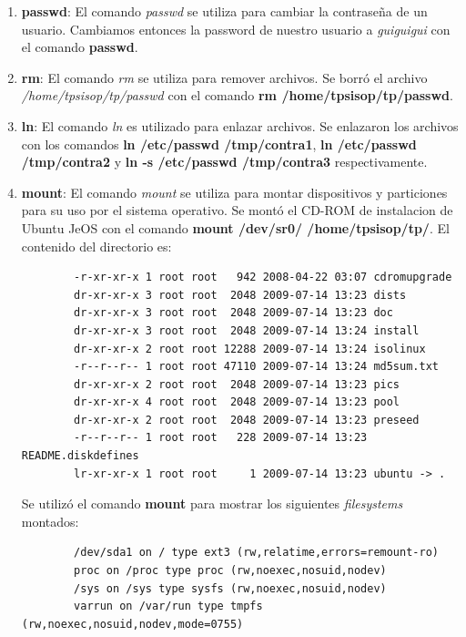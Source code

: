 \documentclass[a4paper,11pt] {article}
\begin{document}
\begin{enumerate}
		\begin{verbatim}
	 			127.0.0.1	localhost
			::1     ip6-localhost ip6-loopback
		\end{verbatim}
Luego para mostrar las l\'ineas de todos los archivos en \textit{/etc} que contienen el texto ``POSIX'' se utiliz\'o el comando \textbf{grep -r POSIX | grep -v} en la carpeta \textit{/etc}.
	\item \textbf{passwd}: El comando \textit{passwd} se utiliza para cambiar la contraseña de un usuario. Cambiamos entonces la password de nuestro usuario a \textit{guiguigui} con el comando \textbf{passwd}.
	\item \textbf{rm}: El comando \textit{rm} se utiliza para remover archivos. Se borr\'o el archivo \\ \textit{/home/tpsisop/tp/passwd} con el comando \textbf{rm /home/tpsisop/tp/passwd}.
	\item \textbf{ln}: El comando \textit{ln} es utilizado para enlazar archivos. Se enlazaron los archivos con los comandos \textbf{ln /etc/passwd /tmp/contra1}, \textbf{ln /etc/passwd /tmp/contra2} y \textbf{ln -s /etc/passwd /tmp/contra3} respectivamente.
	\item \textbf{mount}: El comando \textit{mount} se utiliza para montar dispositivos y particiones para su uso por el sistema operativo. Se mont\'o el CD-ROM de instalacion de Ubuntu JeOS con el comando \textbf{mount /dev/sr0/ /home/tpsisop/tp/}. El contenido del directorio es:
	\begin{verbatim}
		-r-xr-xr-x 1 root root   942 2008-04-22 03:07 cdromupgrade
		dr-xr-xr-x 3 root root  2048 2009-07-14 13:23 dists
		dr-xr-xr-x 3 root root  2048 2009-07-14 13:23 doc
		dr-xr-xr-x 3 root root  2048 2009-07-14 13:24 install
		dr-xr-xr-x 2 root root 12288 2009-07-14 13:24 isolinux
		-r--r--r-- 1 root root 47110 2009-07-14 13:24 md5sum.txt
		dr-xr-xr-x 2 root root  2048 2009-07-14 13:23 pics
		dr-xr-xr-x 4 root root  2048 2009-07-14 13:23 pool
		dr-xr-xr-x 2 root root  2048 2009-07-14 13:23 preseed
		-r--r--r-- 1 root root   228 2009-07-14 13:23 README.diskdefines
		lr-xr-xr-x 1 root root     1 2009-07-14 13:23 ubuntu -> .
	\end{verbatim}
	Se utiliz\'o el comando \textbf{mount} para mostrar los siguientes \textit{filesystems} montados:
	\begin{verbatim}
		/dev/sda1 on / type ext3 (rw,relatime,errors=remount-ro)
		proc on /proc type proc (rw,noexec,nosuid,nodev)
		/sys on /sys type sysfs (rw,noexec,nosuid,nodev)
		varrun on /var/run type tmpfs (rw,noexec,nosuid,nodev,mode=0755)

\end{verbatim}
\end{enumerate}
\end{document}
